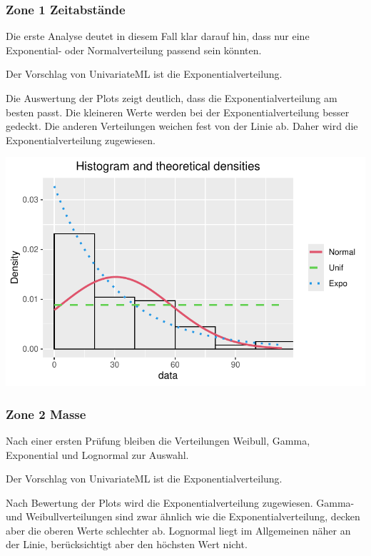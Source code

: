 \documentclass[
  letterpaper,
  DIV=11,
  numbers=noendperiod]{scrartcl}
\begin{document}
\subsubsection{Zone 1 Zeitabstände}\label{zone-1-zeitabstuxe4nde}

Die erste Analyse deutet in diesem Fall klar darauf hin, dass nur eine
Exponential- oder Normalverteilung passend sein könnten.

Der Vorschlag von UnivariateML ist die Exponentialverteilung.

Die Auswertung der Plots zeigt deutlich, dass die Exponentialverteilung
am besten passt. Die kleineren Werte werden bei der
Exponentialverteilung besser gedeckt. Die anderen Verteilungen weichen
fest von der Linie ab. Daher wird die Exponentialverteilung zugewiesen.

\includegraphics{steinschlag_bericht_files/figure-pdf/unnamed-chunk-8-1.pdf}

\subsubsection{Zone 2 Masse}\label{zone-2-masse}

Nach einer ersten Prüfung bleiben die Verteilungen Weibull, Gamma,
Exponential und Lognormal zur Auswahl.

Der Vorschlag von UnivariateML ist die Exponentialverteilung.

Nach Bewertung der Plots wird die Exponentialverteilung zugewiesen.
Gamma- und Weibullverteilungen sind zwar ähnlich wie die
Exponentialverteilung, decken aber die oberen Werte schlechter ab.
Lognormal liegt im Allgemeinen näher an der Linie, berücksichtigt aber
den höchsten Wert nicht.
\end{document}
